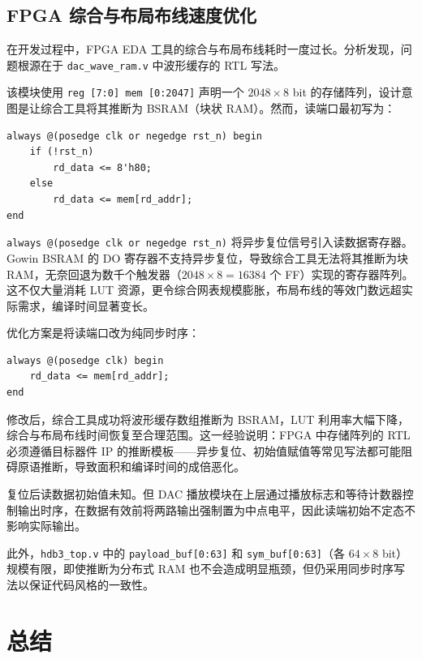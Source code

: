 \documentclass[UTF8,a4paper,12pt]{ctexart}
\begin{document}
\subsection{FPGA 综合与布局布线速度优化}

在开发过程中，FPGA EDA 工具的综合与布局布线耗时一度过长。分析发现，问题根源在于 \texttt{dac\_wave\_ram.v} 中波形缓存的 RTL 写法。

该模块使用 \texttt{reg [7:0] mem [0:2047]} 声明一个 $2048 \times 8$ bit 的存储阵列，设计意图是让综合工具将其推断为 BSRAM（块状 RAM）。然而，读端口最初写为：

\begin{lstlisting}[style=VerilogStyle,caption={优化前的读端口时序（关键问题）},label={lst:ram_bad}]
always @(posedge clk or negedge rst_n) begin
    if (!rst_n)
        rd_data <= 8'h80;
    else
        rd_data <= mem[rd_addr];
end
\end{lstlisting}

\texttt{always @(posedge clk or negedge rst\_n)} 将异步复位信号引入读数据寄存器。Gowin BSRAM 的 DO 寄存器不支持异步复位，导致综合工具无法将其推断为块 RAM，无奈回退为数千个触发器（$2048 \times 8 = 16384$ 个 FF）实现的寄存器阵列。这不仅大量消耗 LUT 资源，更令综合网表规模膨胀，布局布线的等效门数远超实际需求，编译时间显著变长。

优化方案是将读端口改为纯同步时序：

\begin{lstlisting}[style=VerilogStyle,caption={优化后的读端口（纯同步，可推断为 BSRAM）},label={lst:ram_good}]
always @(posedge clk) begin
    rd_data <= mem[rd_addr];
end
\end{lstlisting}

修改后，综合工具成功将波形缓存数组推断为 BSRAM，LUT 利用率大幅下降，综合与布局布线时间恢复至合理范围。这一经验说明：FPGA 中存储阵列的 RTL 必须遵循目标器件 IP 的推断模板——异步复位、初始值赋值等常见写法都可能阻碍原语推断，导致面积和编译时间的成倍恶化。

复位后读数据初始值未知。但 DAC 播放模块在上层通过播放标志和等待计数器控制输出时序，在数据有效前将两路输出强制置为中点电平，因此读端初始不定态不影响实际输出。

此外，\texttt{hdb3\_top.v} 中的 \texttt{payload\_buf[0:63]} 和 \texttt{sym\_buf[0:63]}（各 $64 \times 8$ bit）规模有限，即使推断为分布式 RAM 也不会造成明显瓶颈，但仍采用同步时序写法以保证代码风格的一致性。

\section{总结}
\end{document}
